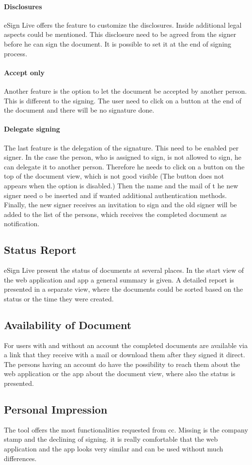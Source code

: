\paragraph{Disclosures}
eSign Live offers the feature to customize the disclosures. Inside additional legal aspects could be mentioned. This disclosure need to be agreed from the signer before he can sign the document. It is possible to set it at the end of signing process. 

\paragraph{Accept only}
Another feature is the option to let the document be accepted by another person. This is different to the signing. The user need to click on a button at the end of the document and there will be no signature done.

\paragraph{Delegate signing} 
The last feature is the delegation of the signature. This need to be enabled per signer. In the case the person, who is assigned to sign, is not allowed to sign, he can delegate it to another person. Therefore he needs to click on a button on the top of the document view, which is not good visible (The button does not appears when the option is disabled.) Then the name and the mail of t he new signer need o be inserted and if wanted additional authentication methods. Finally, the new signer receives an invitation to sign and the old signer will be added to the list of the persons, which receives the completed document as notification.

\subsection{Status Report}
eSign Live present the status of documents at several places. In the start view of the web application and \gls{app} a general summary is given. A detailed report is presented in a separate view, where the documents could be sorted based on the status or the time they were created.

\subsection{Availability of Document}
For users with and without an account the completed documents are available via a link that they receive with a mail or download them after they signed it direct. The persons having an account do have the possibility to reach them about the web application or the \gls{app} about the document view, where also the status is presented.

\subsection{Personal Impression}
The tool offers the most functionalities requested from \gls{cc}. Missing is the company stamp and the declining of signing. it is really comfortable that the web application and the \gls{app} looks very similar and can be used without much differences.